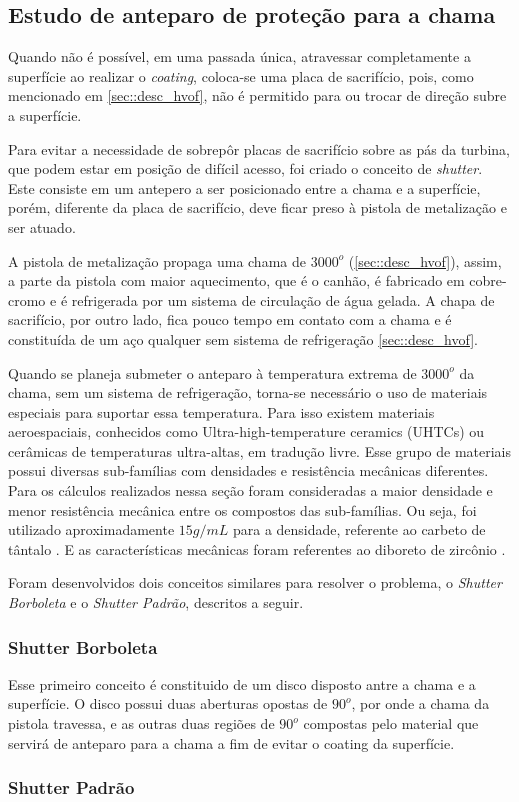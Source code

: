 \subsection{Estudo de anteparo de proteção para a chama}
Quando não é possível, em uma passada única, atraves\-sar completamente a
superfície ao realizar o \textit{coating}, coloca-se uma placa de sacrifício, pois, como
menciona\-do em \ref{sec::desc_hvof}, não é permitido para ou trocar de direção
subre a superfície.

Para evitar a necessidade de sobrepôr placas de sacrifício sobre as pás da
turbina, que podem estar em posição de difícil acesso, foi criado o conceito de
\textit{shutter}. Este consiste em um antepero a ser posicionado entre a chama e
a superfície, porém, diferente da placa de sacrifício, deve ficar preso à
pistola de metalização e ser atuado.

A pistola de metalização propaga uma chama de $3000^o$ (\ref{sec::desc_hvof}), assim,
a parte da pistola com maior aquecimento, que é o canhão, é fabricado em
cobre-cromo e é refrigerada por um sistema de circulação de água
gelada. A chapa de sacrifício, por outro lado, fica pouco tempo em contato com
a chama e é constituída de um aço qualquer sem sistema de refrigeração
\ref{sec::desc_hvof}.

Quando se planeja submeter o anteparo à temperatu\-ra extrema de $3000^o$ da
chama, sem um sistema de refrigeração, torna-se necessário o uso de materia\-is
especiais para suportar essa temperatura. Para isso existem materiais
aeroespaciais, conhecidos como Ultra-high-temperature ceramics (UHTCs) ou
cerâmi\-cas de temperaturas ultra-altas, em tradução livre. Esse grupo de
materiais possui diversas sub-famílias com densidades e resistência mecânicas
diferentes. Para os cálculos realizados nessa seção foram consideradas a maior
densidade e menor resistência mecânica entre os compostos das sub-famílias. Ou
seja, foi utilizado aproximadamente \textbf{$15 g/mL$} para a densidade, referente ao
carbeto de tântalo \citep{bansal2005ceramic}. E as características mecânicas
foram referentes ao diboreto de zircônio \citep{diborides}.

Foram desenvolvidos dois conceitos similares para resolver o problema, o \textit{Shutter
Borboleta} e o \textit{Shutter Padrão}, descritos a seguir.

\subsubsection{Shutter Borboleta}

Esse primeiro conceito é constituido de um disco disposto antre a chama e a
superfície. O disco possui duas aberturas opostas de $90^o$, por onde a chama da
pistola travessa, e as outras duas regiões de $90^o$ compostas pelo material que
servirá de anteparo para a chama a fim de evitar o coating da superfície. 

\subsubsection{Shutter Padrão}